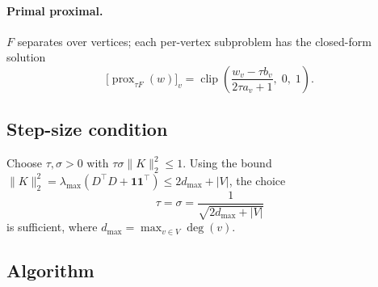 \documentclass{article}
\newcommand{\clip}{\operatorname{clip}}
\begin{document}
\paragraph{Primal proximal.}
$F$ separates over vertices; each per-vertex subproblem has the closed-form
solution
\[
  \bigl[\operatorname{prox}_{\tau F}(w)\bigr]_v
  = \clip\!\left(\frac{w_v - \tau b_v}{2\tau a_v + 1},\;0,\;1\right).
\]

\subsection*{Step-size condition}

Choose $\tau, \sigma > 0$ with $\tau\sigma\|K\|_2^2 \leq 1$.
Using the bound
$\|K\|_2^2 = \lambda_{\max}(D^\top D + \mathbf{1}\mathbf{1}^\top)
            \leq 2d_{\max} + |V|$,
the choice
\[
  \tau = \sigma = \frac{1}{\sqrt{2d_{\max} + |V|}}
\]
is sufficient, where $d_{\max} = \max_{v \in V} \deg(v)$.

\subsection*{Algorithm}
\end{document}
